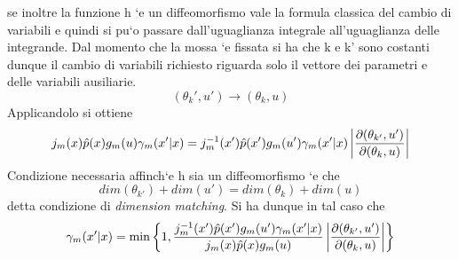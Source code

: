 se inoltre la funzione h `e un diffeomorfismo vale la formula classica del cambio
di variabili e quindi si pu`o passare dall’uguaglianza integrale all’uguaglianza delle
integrande.
Dal momento che la mossa `e fissata si ha che k e k' sono costanti dunque il cambio
di variabili richiesto riguarda solo il vettore dei parametri e delle variabili ausiliarie.
\begin{equation*}
(\theta_k',u')\rightarrow(\theta_k,u)
\end{equation*}
Applicandolo si ottiene
\begin{equation*}
j_m(x)\hat{p}(x)g_m(u)\gamma_m(x'|x)=
j_m^{-1}(x')\hat{p}(x')g_m(u')\gamma_m(x'|x)\left\vert\frac{\partial(\theta_{k'},u') }{\partial(\theta_{k},u) }\right\vert
\end{equation*}
Condizione necessaria affinch`e h sia un diffeomorfismo `e che
\begin{equation}
dim(\theta_{k'})+dim(u')=dim(\theta_{k})+dim(u)
\end{equation}
detta condizione di \emph{dimension matching}. Si ha dunque in tal caso che
\begin{equation}
\gamma_m(x'|x)=\min\left\lbrace 1,\frac{
j_m^{-1}(x')\hat{p}(x')g_m(u')\gamma_m(x'|x)}
{j_m(x)\hat{p}(x)g_m(u)}
\left\vert\frac{\partial(\theta_{k'},u') }{\partial(\theta_{k},u) }\right\vert 
\right\rbrace
\end{equation}